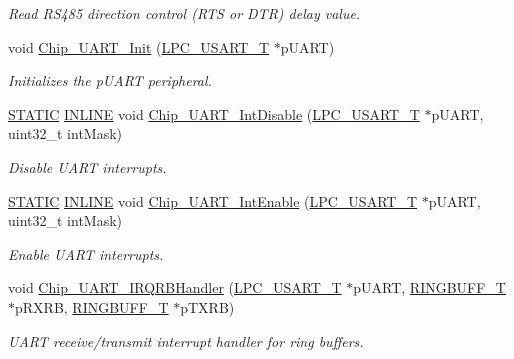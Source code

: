 \begin{DoxyCompactItemize}
\begin{DoxyCompactList}\small\item\em Read R\+S485 direction control (R\+TS or D\+TR) delay value. \end{DoxyCompactList}\item 
void \hyperlink{group__UART__17XX__40XX_gaf024084be4068e407aab7c30e105f7af}{Chip\+\_\+\+U\+A\+R\+T\+\_\+\+Init} (\hyperlink{structLPC__USART__T}{L\+P\+C\+\_\+\+U\+S\+A\+R\+T\+\_\+T} $\ast$p\+U\+A\+RT)
\begin{DoxyCompactList}\small\item\em Initializes the p\+U\+A\+RT peripheral. \end{DoxyCompactList}\item 
\hyperlink{group__LPC__Types__Public__Macros_ga10b2d890d871e1489bb02b7e70d9bdfb}{S\+T\+A\+T\+IC} \hyperlink{group__LPC__Types__Public__Types_ga2eb6f9e0395b47b8d5e3eeae4fe0c116}{I\+N\+L\+I\+NE} void \hyperlink{group__UART__17XX__40XX_gaf92136333a1b6efdfd40e96f97d4a24e}{Chip\+\_\+\+U\+A\+R\+T\+\_\+\+Int\+Disable} (\hyperlink{structLPC__USART__T}{L\+P\+C\+\_\+\+U\+S\+A\+R\+T\+\_\+T} $\ast$p\+U\+A\+RT, uint32\+\_\+t int\+Mask)
\begin{DoxyCompactList}\small\item\em Disable U\+A\+RT interrupts. \end{DoxyCompactList}\item 
\hyperlink{group__LPC__Types__Public__Macros_ga10b2d890d871e1489bb02b7e70d9bdfb}{S\+T\+A\+T\+IC} \hyperlink{group__LPC__Types__Public__Types_ga2eb6f9e0395b47b8d5e3eeae4fe0c116}{I\+N\+L\+I\+NE} void \hyperlink{group__UART__17XX__40XX_ga5a816f48dc294f330cc2cc7b32f9e88b}{Chip\+\_\+\+U\+A\+R\+T\+\_\+\+Int\+Enable} (\hyperlink{structLPC__USART__T}{L\+P\+C\+\_\+\+U\+S\+A\+R\+T\+\_\+T} $\ast$p\+U\+A\+RT, uint32\+\_\+t int\+Mask)
\begin{DoxyCompactList}\small\item\em Enable U\+A\+RT interrupts. \end{DoxyCompactList}\item 
void \hyperlink{group__UART__17XX__40XX_ga8ab537af48951658e60af145690b656e}{Chip\+\_\+\+U\+A\+R\+T\+\_\+\+I\+R\+Q\+R\+B\+Handler} (\hyperlink{structLPC__USART__T}{L\+P\+C\+\_\+\+U\+S\+A\+R\+T\+\_\+T} $\ast$p\+U\+A\+RT, \hyperlink{structRINGBUFF__T}{R\+I\+N\+G\+B\+U\+F\+F\+\_\+T} $\ast$p\+R\+X\+RB, \hyperlink{structRINGBUFF__T}{R\+I\+N\+G\+B\+U\+F\+F\+\_\+T} $\ast$p\+T\+X\+RB)
\begin{DoxyCompactList}\small\item\em U\+A\+RT receive/transmit interrupt handler for ring buffers. \end{DoxyCompactList}\item 

\end{DoxyCompactItemize}
